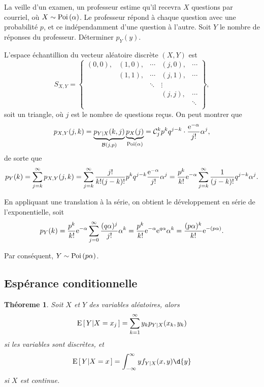 \documentclass[11pt]{article}
\newcommand\comb[2]{%
	\ensuremath{%
		\mathcal{C}_{#2}^{#1}%
	}%
}%
\newcommand\e{%
	\ensuremath{%
		\mathrm{e}%
	}%
}%
\newcommand\Bin[2]{%
	\ensuremath{%
		\mathcal{B}\left(#1,#2\right)%
	}%
}%
\newcommand\Poi[1]{%
	\ensuremath{%
		\mathrm{Poi}\left(#1\right)%
	}%
}%
\newcommand\Espg[2]{%
	\ensuremath{%
		\mathrm{E}\left[\,#1\middle\vert#2\,\right]%
	}%
}%
\newtheorem{theoreme}{Théoreme}[section]
\theoremstyle{remark}
\theoremstyle{definition}
\begin{document}
\begin{exemple}
	La veille d'un examen, un professeur estime qu'il recevra $X$ questions par
	courriel, où $X\sim\Poi{\alpha}$. Le professeur répond à chaque question
	avec une probabilité $p$, et ce indépendamment d'une question à l'autre.
	Soit $Y$ le nombre de réponses du professeur. Déterminer $p_Y(y)$.

	L'espace échantillion du vecteur aléatoire discrète $(X,Y)$ est
	\begin{equation*}
		S_{X,Y}=\left\{
			\begin{matrix}
				(0,0), & (1,0), & \cdots & (j,0), & \cdots\\
				       & (1,1), & \cdots & (j,1), & \cdots\\
				       &        & \ddots & \vdots &       \\
				       &        &        & (j,j), & \cdots\\
					   &        &        &        & \ddots\\
			\end{matrix}
		\right\},
	\end{equation*}
	soit un triangle, où $j$ est le nombre de questions reçus. On peut montrer
	que
	\begin{equation*}
		p_{X,Y}(j,k)
		=\underbrace{p_{Y|X}(k,j)}_{\Bin{j}{p}}
		 \underbrace{p_X(j)}_{\Poi{\alpha}}
		=\comb{k}{j}p^kq^{j-k}\cdot\frac{\e^{-\alpha}}{j!}\alpha^j,
	\end{equation*}
	de sorte que
	\begin{equation*}
		p_Y(k)
		=\sum_{j=k}^\infty p_{X,Y}(j,k)
		=\sum_{j=k}^\infty\frac{j!}{k!(j-k)!}p^kq^{j-k}\frac{\e^{-\alpha}}{j!}
			\alpha^j
		=\frac{p^k}{k!}\e^{-\alpha}\sum_{j=k}^\infty\frac{1}{(j-k)!}q^{j-k}
			\alpha^j.
	\end{equation*}
\end{exemple}
\addtocounter{exemple}{-1}
\begin{exemple}[suite]
	En appliquant une translation à la série, on obtient le développement en
	série de l'exponentielle, soit
	\begin{equation*}
		p_Y(k)
		=\frac{p^k}{k!}\e^{-\alpha}\sum_{j=0}^\infty\frac{(q\alpha)^j}{j!}
			\alpha^k
		=\frac{p^k}{k!}\e^{-\alpha}\e^{q\alpha}\alpha^k
		=\frac{(p\alpha)^k}{k!}\e^{-(p\alpha)}.
	\end{equation*}

	Par conséquent, $Y\sim\Poi{p\alpha}$.
\end{exemple}

\subsection{Espérance conditionnelle}
\begin{theoreme}
	Soit $X$ et $Y$ des variables aléatoires, alors
	\begin{equation*}
		\Espg{Y}{X=x_j}=\sum_{k=1}^\infty y_kp_{Y|X}(x_k,y_k)
	\end{equation*}
	si les variables sont discrètes, et
	\begin{equation*}
		\Espg{Y}{X=x}=\int_{-\infty}^\infty yf_{Y|X}(x,y)\d{y}
	\end{equation*}
	si $X$ est continue.
\end{theoreme}
\end{document}

